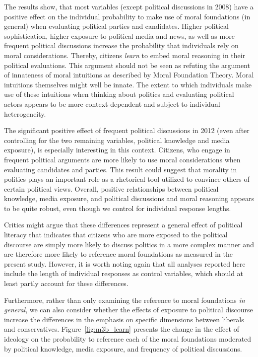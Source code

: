 \documentclass[12pt]{article}
\begin{document}
The results show, that most variables (except political discussions in 2008) have a positive effect on the individual probability to make use of moral foundations (in general) when evaluating political parties and candidates. Higher political sophistication, higher exposure to political media and news, as well as more frequent political discussions increase the probability that individuals rely on moral considerations. Thereby, citizens \textit{learn} to embed moral reasoning in their political evaluations. This argument should not be seen as refuting the argument of innateness of moral intuitions as described by Moral Foundation Theory. Moral intuitions themselves might well be innate. The extent to which individuals make use of these intuitions when thinking about politics and evaluating political actors appears to be more context-dependent and subject to individual heterogeneity.

The significant positive effect of frequent political discussions in 2012 (even after controlling for the two remaining variables, political knowledge and media exposure), is especially interesting in this context. Citizens, who engage in frequent political arguments are more likely to use moral considerations when evaluating candidates and parties. This result could suggest that morality in politics plays an important role as a rhetorical tool utilized to convince others of certain political views. Overall, positive relationships between political knowledge, media exposure, and political discussions and moral reasoning appears to be quite robust, even though we control for individual response lengths.

Critics might argue that these differences represent a general effect of political literacy that indicates that citizens who are more exposed to the political discourse are simply more likely to discuss politics in a more complex manner and are therefore more likely to reference moral foundations as measured in the present study. However, it is worth noting again that all analyses reported here include the length of individual responses as control variables, which should at least partly account for these differences.

Furthermore, rather than only examining the reference to moral foundations \textit{in general}, we can also consider whether the effects of exposure to political discourse increase the differences in the emphasis on specific dimensions between liberals and conservatives. Figure~\ref{fig:m3b_learn} presents the change in the effect of ideology on the probability to reference each of the moral foundations moderated by political knowledge, media exposure, and frequency of political discussions.
\end{document}

